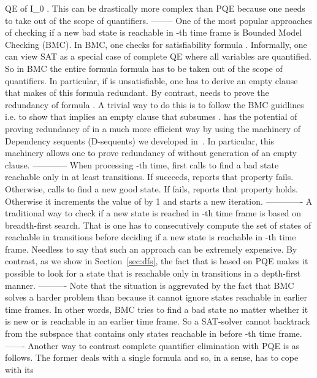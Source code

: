  QE of  {I_0 \wedge {}}. This
can be drastically more complex than PQE because one needs to take
 out of the scope of quantifiers.
--------
One of the most popular approaches of checking if a new bad state is
reachable in -th time frame is Bounded Model Checking (BMC). In
BMC, one checks for satisfiability formula . Informally, one can view SAT as a special case
of complete QE where all variables are quantified. So in BMC the
entire formula formula has to be taken out of the scope of
quantifiers.  In particular, if  is unsatisfiable, one has to derive an empty clause
that makes  of this formula redundant. By contrast,
\NBS needs to prove  the redundancy of formula . A
trivial way to do this is to follow the BMC guidlines i.e. to show
that  implies an empty
clause that subsumes .  \NBS has the potential of proving
redundancy of  in a much more efficient way by using the
machinery of Dependency sequents (D-sequents) we developed
in~\cite{fmcad12,fmcad13}.  In particular, this machinery allows one
to prove redundancy of  without generation of an empty clause. 
------------
 When processing -th time, \ST first calls \NBS to find a
bad state reachable only in at least  transitions.  If \NBS
succeeds, \ST reports that property  fails. Otherwise, \ST calls
\NS to find a new good state.  If \NS fails, \ST reports that property
 holds. Otherwise it increments the value of  by 1 and starts a
new iteration.
-------------
 A
traditional way to check if a new state is reached in -th time
frame is based on breadth-first search. That is one has to
consecutively compute the set of states of reachable in
 transitions before deciding if a new state is
reachable in -th time frame. Needless to say that such an approach
can be extremely expensive. By contrast, as we show in
Section~\ref{sec:dfs}, the fact that \NS is based on PQE makes it
possible to look for a state that is reachable only in  transitions
in a depth-first manner.
----------
Note that the situation is aggrevated by the fact that BMC
solves a harder problem than \NBS because it cannot ignore states
reachable in earlier time frames. In other words, BMC tries to find a
bad state no matter whether it is new or is reachable in an earlier
time frame.  So a SAT-solver cannot backtrack from the subspace that
contains only states reachable in before -th time frame. 
-------
 Another way to contrast complete
quantifier elimination with PQE is as follows.  The former deals with
a single formula and so, in a sense, has to cope with its
